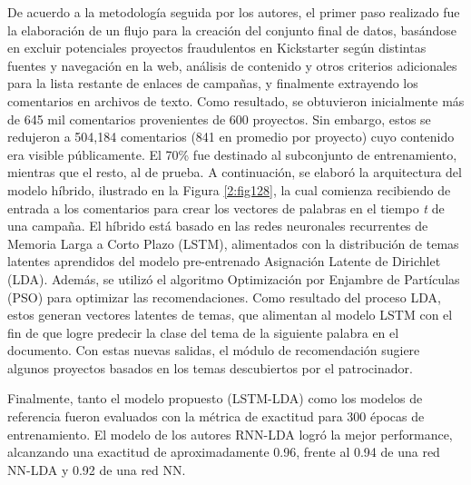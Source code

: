 De acuerdo a la metodología seguida por los autores, el primer paso realizado fue la elaboración de un flujo para la creación del conjunto final de datos, basándose en excluir potenciales proyectos fraudulentos en Kickstarter según distintas fuentes y navegación en la web, análisis de contenido y otros criterios adicionales para la lista restante de enlaces de campañas, y finalmente extrayendo los comentarios en archivos de texto. Como resultado, se obtuvieron inicialmente más de 645 mil comentarios provenientes de 600 proyectos. Sin embargo, estos se redujeron a 504,184 comentarios (841 en promedio por proyecto) cuyo contenido era visible públicamente. El 70\% fue destinado al subconjunto de entrenamiento, mientras que el resto, al de prueba. A continuación, se elaboró la arquitectura del modelo híbrido, ilustrado en la Figura \ref{2:fig128}, la cual comienza recibiendo de entrada a los comentarios para crear los vectores de palabras en el tiempo \textit{t} de una campaña. El híbrido está basado en las redes neuronales recurrentes de Memoria Larga a Corto Plazo (LSTM), alimentados con la distribución de temas latentes aprendidos del modelo pre-entrenado Asignación Latente de Dirichlet (LDA). Además, se utilizó el algoritmo Optimización por Enjambre de Partículas (PSO) para optimizar las recomendaciones. Como resultado del proceso LDA, estos generan vectores latentes de temas, que alimentan al modelo LSTM con el fin de que logre predecir la clase del tema de la siguiente palabra en el documento. Con estas nuevas salidas, el módulo de recomendación sugiere algunos proyectos basados en los temas descubiertos por el patrocinador.

Finalmente, tanto el modelo propuesto (LSTM-LDA) como los modelos de referencia fueron evaluados con la métrica de exactitud para 300 épocas de entrenamiento. El modelo de los autores RNN-LDA logró la mejor performance, alcanzando una exactitud de aproximadamente 0.96, frente al 0.94 de una red NN-LDA y 0.92 de una red NN.

